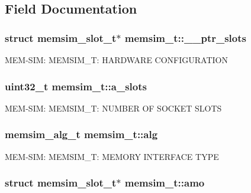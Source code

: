 \subsection{Field Documentation}
\hypertarget{structmemsim__t_a13bfc8f8ea24eb83b5b3976aee534db3}{
\subsubsection[{\-\_\-\-\_\-ptr\-\_\-slots}]{\setlength{\rightskip}{0pt plus 5cm}struct {\bf memsim\-\_\-slot\-\_\-t}$\ast$ memsim\-\_\-t\-::\-\_\-\-\_\-ptr\-\_\-slots}}\label{structmemsim__t_a13bfc8f8ea24eb83b5b3976aee534db3}
M\-E\-M-\/\-S\-I\-M\-: M\-E\-M\-S\-I\-M\-\_\-\-T\-: H\-A\-R\-D\-W\-A\-R\-E C\-O\-N\-F\-I\-G\-U\-R\-A\-T\-I\-O\-N \hypertarget{structmemsim__t_a855dbf0b36cad4e37ccb8dcb26caa864}{
\subsubsection[{a\-\_\-slots}]{\setlength{\rightskip}{0pt plus 5cm}uint32\-\_\-t memsim\-\_\-t\-::a\-\_\-slots}}\label{structmemsim__t_a855dbf0b36cad4e37ccb8dcb26caa864}
M\-E\-M-\/\-S\-I\-M\-: M\-E\-M\-S\-I\-M\-\_\-\-T\-: N\-U\-M\-B\-E\-R O\-F S\-O\-C\-K\-E\-T S\-L\-O\-T\-S \hypertarget{structmemsim__t_ae9ec2da913a82a570dae07d3ae8d09b3}{
\subsubsection[{alg}]{\setlength{\rightskip}{0pt plus 5cm}memsim\-\_\-alg\-\_\-t memsim\-\_\-t\-::alg}}\label{structmemsim__t_ae9ec2da913a82a570dae07d3ae8d09b3}
M\-E\-M-\/\-S\-I\-M\-: M\-E\-M\-S\-I\-M\-\_\-\-T\-: M\-E\-M\-O\-R\-Y I\-N\-T\-E\-R\-F\-A\-C\-E T\-Y\-P\-E \hypertarget{structmemsim__t_a9e7a2ce164d954f25105d93eaf040b3f}{
\subsubsection[{amo}]{\setlength{\rightskip}{0pt plus 5cm}struct {\bf memsim\-\_\-slot\-\_\-t}$\ast$ memsim\-\_\-t\-::amo}}\label{structmemsim__t_a9e7a2ce164d954f25105d93eaf040b3f}
